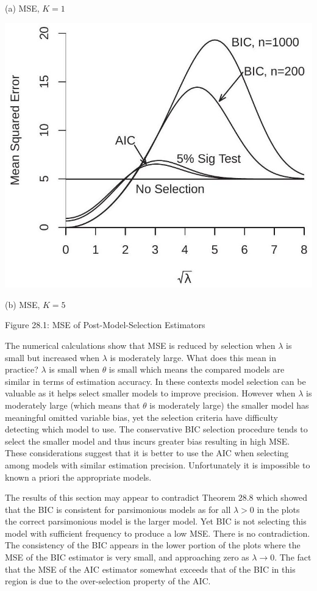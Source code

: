 \documentclass[10pt]{article}
\begin{document}
(a) MSE, $K=1$

\includegraphics[max width=\textwidth]{2022_10_23_101d59f261a704807a3bg-23(1)}

(b) MSE, $K=5$

Figure 28.1: MSE of Post-Model-Selection Estimators

The numerical calculations show that MSE is reduced by selection when $\lambda$ is small but increased when $\lambda$ is moderately large. What does this mean in practice? $\lambda$ is small when $\theta$ is small which means the compared models are similar in terms of estimation accuracy. In these contexts model selection can be valuable as it helps select smaller models to improve precision. However when $\lambda$ is moderately large (which means that $\theta$ is moderately large) the smaller model has meaningful omitted variable bias, yet the selection criteria have difficulty detecting which model to use. The conservative BIC selection procedure tends to select the smaller model and thus incurs greater bias resulting in high MSE. These considerations suggest that it is better to use the AIC when selecting among models with similar estimation precision. Unfortunately it is impossible to known a priori the appropriate models.

The results of this section may appear to contradict Theorem $28.8$ which showed that the BIC is consistent for parsimonious models as for all $\lambda>0$ in the plots the correct parsimonious model is the larger model. Yet BIC is not selecting this model with sufficient frequency to produce a low MSE. There is no contradiction. The consistency of the BIC appears in the lower portion of the plots where the MSE of the BIC estimator is very small, and approaching zero as $\lambda \rightarrow 0$. The fact that the MSE of the AIC estimator somewhat exceeds that of the BIC in this region is due to the over-selection property of the AIC.
\end{document}
